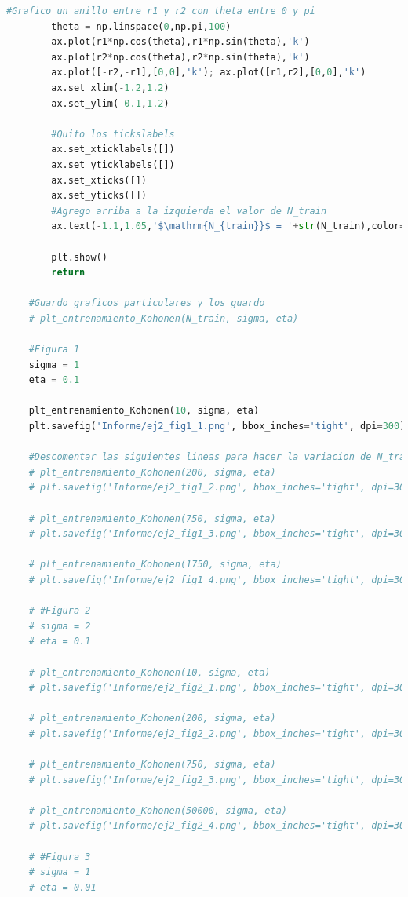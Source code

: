 \documentclass[aps,prb,twocolumn,superscriptaddress,floatfix,longbibliography]{revtex4-2}
\newcounter{para}
\begin{document}
\begin{lstlisting}[language=Python]
        #Grafico un anillo entre r1 y r2 con theta entre 0 y pi
        theta = np.linspace(0,np.pi,100)
        ax.plot(r1*np.cos(theta),r1*np.sin(theta),'k')
        ax.plot(r2*np.cos(theta),r2*np.sin(theta),'k')
        ax.plot([-r2,-r1],[0,0],'k'); ax.plot([r1,r2],[0,0],'k')
        ax.set_xlim(-1.2,1.2)
        ax.set_ylim(-0.1,1.2)
    
        #Quito los tickslabels
        ax.set_xticklabels([])
        ax.set_yticklabels([])
        ax.set_xticks([])
        ax.set_yticks([])
        #Agrego arriba a la izquierda el valor de N_train
        ax.text(-1.1,1.05,'$\mathrm{N_{train}}$ = '+str(N_train),color="k",alpha=1)
    
        plt.show()
        return
    
    #Guardo graficos particulares y los guardo
    # plt_entrenamiento_Kohonen(N_train, sigma, eta)
    
    #Figura 1
    sigma = 1
    eta = 0.1
    
    plt_entrenamiento_Kohonen(10, sigma, eta)
    plt.savefig('Informe/ej2_fig1_1.png', bbox_inches='tight', dpi=300)
    
    #Descomentar las siguientes lineas para hacer la variacion de N_train, eta y sigma
    # plt_entrenamiento_Kohonen(200, sigma, eta)
    # plt.savefig('Informe/ej2_fig1_2.png', bbox_inches='tight', dpi=300)
    
    # plt_entrenamiento_Kohonen(750, sigma, eta)
    # plt.savefig('Informe/ej2_fig1_3.png', bbox_inches='tight', dpi=300)
    
    # plt_entrenamiento_Kohonen(1750, sigma, eta)
    # plt.savefig('Informe/ej2_fig1_4.png', bbox_inches='tight', dpi=300)
    
    # #Figura 2
    # sigma = 2
    # eta = 0.1
    
    # plt_entrenamiento_Kohonen(10, sigma, eta)
    # plt.savefig('Informe/ej2_fig2_1.png', bbox_inches='tight', dpi=300)
    
    # plt_entrenamiento_Kohonen(200, sigma, eta)
    # plt.savefig('Informe/ej2_fig2_2.png', bbox_inches='tight', dpi=300)
    
    # plt_entrenamiento_Kohonen(750, sigma, eta)
    # plt.savefig('Informe/ej2_fig2_3.png', bbox_inches='tight', dpi=300)
    
    # plt_entrenamiento_Kohonen(50000, sigma, eta)
    # plt.savefig('Informe/ej2_fig2_4.png', bbox_inches='tight', dpi=300)
    
    # #Figura 3
    # sigma = 1
    # eta = 0.01
    

\end{lstlisting}
\end{document}
